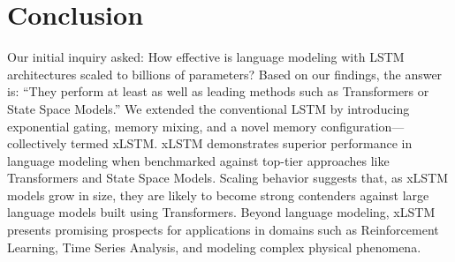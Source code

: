 \section{Conclusion}
Our initial inquiry asked: How effective is language modeling with LSTM architectures scaled to billions of parameters? Based on our findings, the answer is: “They perform at least as well as leading methods such as Transformers or State Space Models.” We extended the conventional LSTM by introducing exponential gating, memory mixing, and a novel memory configuration—collectively termed xLSTM. xLSTM demonstrates superior performance in language modeling when benchmarked against top-tier approaches like Transformers and State Space Models. Scaling behavior suggests that, as xLSTM models grow in size, they are likely to become strong contenders against large language models built using Transformers. Beyond language modeling, xLSTM presents promising prospects for applications in domains such as Reinforcement Learning, Time Series Analysis, and modeling complex physical phenomena.

